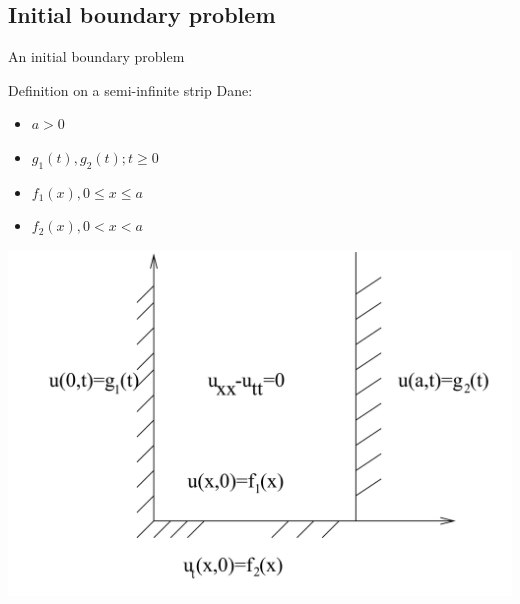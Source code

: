 


\subsection{Initial boundary problem}

\begin{frame}{An initial boundary problem}

 \begin{block}{Definition on a semi-infinite strip}
Dane:
\begin{itemize}    
\item $a>0$
\item $g_1(t), g_2(t); t \ge 0$
\item $f_1(x), 0 \le x\le a$
\item $f_2(x), 0 < x < a$
\end{itemize}
	
\end{block}

\end{frame}

\begin{frame}
  \centerline{\includegraphics[height = 0.85 \textheight]{img/23/initial_boundary}}
\end{frame}

